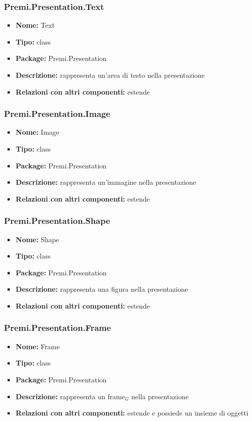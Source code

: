 \subsubsection{Premi.Presentation.Text}
\begin{itemize}
  \item \textbf{Nome:} Text
  \item \textbf{Tipo:} class
  \item \textbf{Package:} Premi.Presentation
  \item \textbf{Descrizione:} rappresenta un'area di testo nella presentazione
    \item \textbf{Relazioni con altri componenti:} estende 
\end{itemize}
\subsubsection{Premi.Presentation.Image}
\begin{itemize}
  \item \textbf{Nome:} Image
  \item \textbf{Tipo:} class
  \item \textbf{Package:} Premi.Presentation
  \item \textbf{Descrizione:} rappresenta un'immagine nella presentazione
      \item \textbf{Relazioni con altri componenti:} estende 
\end{itemize}
\subsubsection{Premi.Presentation.Shape}
\begin{itemize}
  \item \textbf{Nome:} Shape
  \item \textbf{Tipo:} class
  \item \textbf{Package:} Premi.Presentation
  \item \textbf{Descrizione:} rappresenta una figura nella presentazione
      \item \textbf{Relazioni con altri componenti:} estende 
\end{itemize}
\subsubsection{Premi.Presentation.Frame}
\begin{itemize}
  \item \textbf{Nome:} Frame
  \item \textbf{Tipo:} class
  \item \textbf{Package:} Premi.Presentation
  \item \textbf{Descrizione:} rappresenta un frame$_G$ nella presentazione
  \item \textbf{Relazioni con altri componenti:} estende  e possiede un insieme di oggetti 
\end{itemize}
